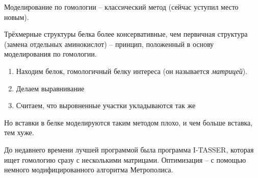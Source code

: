 \documentclass[main.tex]{subfiles}
\begin{document}
Моделирование по гомологии -- классический метод (сейчас уступил место новым).

Трёхмерные структуры белка более консервативные, чем первичная структура (замена отдельных аминокислот) -- принцип, положенный в основу моделирования по гомологии.

\begin{enumerate}[noitemsep]
	\item Находим белок, гомологичный белку интереса (он называется \emph{матрицей}).
	\item Делаем выравнивание
	\item Считаем, что выровненные участки укладываются так же
\end{enumerate}

Но вставки в белке моделируются таким методом плохо, и чем больше вставка, тем хуже.

До недавнего времени лучшей программой была программа I-TASSER, которая ищет гомологию сразу с несколькими матрицами.
Оптимизация -- с помощью немного модифицированного алгоритма Метрополиса.
\end{document}
